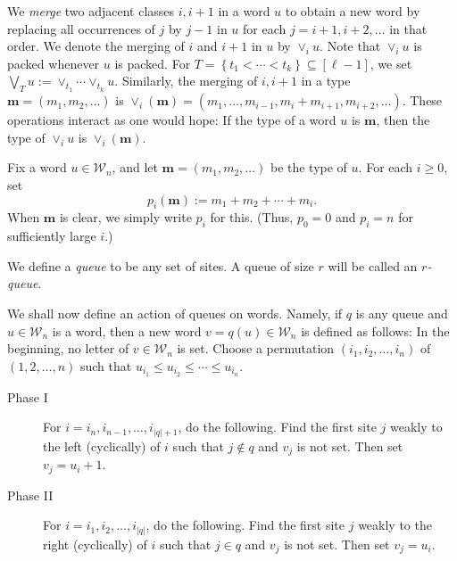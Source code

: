\documentclass[reqno]{amsart}%
\newcommand{\0}{\phantom{c}}
\theoremstyle{plain}
\theoremstyle{definition}
\numberwithin{equation}{section}
\begin{document}
We {\color{darkred}\emph{merge}} two adjacent classes $i,i+1$ in a word $u$ to
obtain a new word by replacing all occurrences of $j$ by $j-1$ in $u$ for each
$j = i+1, i+2, \ldots$ in that order. We denote the merging of $i$ and $i+1$
in $u$ by $\vee_{i} u$. Note that $\vee_{i} u$ is packed whenever $u$ is
packed. For $T = \left\{  t_{1} < \cdots< t_{k} \right\}  \subseteq\left[
\ell-1 \right]  $, we set $\bigvee_{T} u := \vee_{t_{1}} \cdots\vee_{t_{k}}
u$. Similarly, the merging of $i,i+1$ in a type $\mathbf{m} = (m_{1}, m_{2},
\ldots)$ is $\vee_{i}(\mathbf{m}) = (m_{1}, \dotsc, m_{i-1}, m_{i} + m_{i+1},
m_{i+2}, \ldots)$. These operations interact as one would hope: If the type of
a word $u$ is $\mathbf{m}$, then the type of $\vee_{i} u$ is $\vee
_{i}(\mathbf{m})$.

Fix a word $u \in\mathcal{W}_{n}$, and let $\mathbf{m} = (m_{1}, m_{2},
\ldots)$ be the type of $u$. For each $i \geq0$, set
\begin{equation}
\label{eq:type_partial_sums}p_{i}(\mathbf{m}) := m_{1} + m_{2} + \cdots+
m_{i}.
\end{equation}
When $\mathbf{m}$ is clear, we simply write $p_{i}$ for this. (Thus, $p_{0} =
0$ and $p_{i} = n$ for sufficiently large $i$.)

We define a {\color{darkred}\emph{queue}} to be any set of sites. A queue of
size $r$ will be called an {\color{darkred}\emph{$r$-queue}}.

We shall now define an action of queues on words. Namely, if $q$ is any queue
and $u \in\mathcal{W}_{n}$ is a word, then a new word $v = q(u) \in
\mathcal{W}_{n}$ is defined as follows: In the beginning, no letter of $v
\in\mathcal{W}_{n}$ is set. Choose a permutation $\left(  i_{1}, i_{2},
\ldots, i_{n} \right)  $ of $\left(  1, 2, \ldots, n \right)  $ such that
$u_{i_{1}} \leq u_{i_{2}} \leq\cdots\leq u_{i_{n}}$.

\begin{description}
\item[Phase I] For $i = i_{n}, i_{n-1}, \ldots, i_{\left|  q \right|  +1}$, do
the following. Find the first site $j$ weakly to the left (cyclically) of $i$
such that $j \notin q$ and $v_{j}$ is not set. Then set $v_{j} = u_{i} + 1$.

\item[Phase II] For $i = i_{1}, i_{2}, \ldots, i_{\left|  q \right|  }$, do
the following. Find the first site $j$ weakly to the right (cyclically) of $i$
such that $j \in q$ and $v_{j}$ is not set. Then set $v_{j} = u_{i}$.
\end{description}
\end{document}
